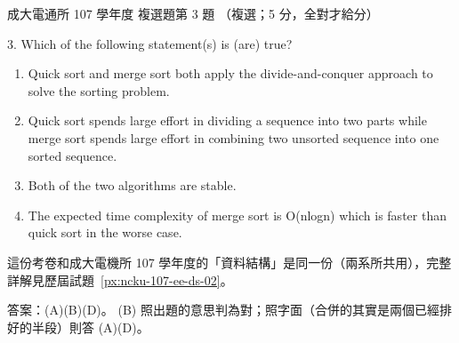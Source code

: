 \begin{pastexam}[label={px:ncku-107-cce-02}]{成大電通所 107 學年度 複選題第 3 題}
（複選；5 分，全對才給分）

3. Which of the following statement(s) is (are) true?
\begin{enumerate}[label=(\Alph*)]
\item Quick sort and merge sort both apply the divide-and-conquer approach to solve the sorting problem.
\item Quick sort spends large effort in dividing a sequence into two parts while merge sort spends large
effort in combining two unsorted sequence into one sorted sequence.
\item Both of the two algorithms are stable.
\item The expected time complexity of merge sort is O(nlogn) which is faster than quick sort in the
worse case.
\end{enumerate}
\end{pastexam}

\begin{pastsoln}
這份考卷和成大電機所 107 學年度的「資料結構」是同一份（兩系所共用），完整詳解見歷屆試題~\ref{px:ncku-107-ee-ds-02}。

答案：(A)(B)(D)。 (B) 照出題的意思判為對；照字面（合併的其實是兩個已經排好的半段）則答 (A)(D)。
\end{pastsoln}
